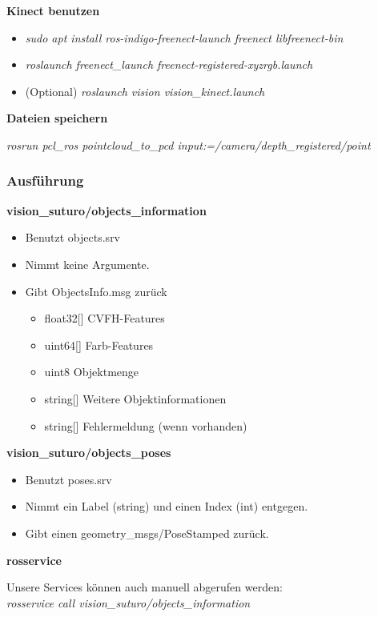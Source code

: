 \documentclass{suturo}
\begin{document}
\textbf{Kinect benutzen}
\begin{itemize}
\item \textit{sudo apt install ros-indigo-freenect-launch freenect libfreenect-bin}
\item \textit{roslaunch freenect\_launch freenect-registered-xyzrgb.launch}
\item (Optional) \textit{roslaunch vision vision\_kinect.launch}
\end{itemize}

\textbf{Dateien speichern}

    \textit{rosrun pcl\_ros pointcloud\_to\_pcd input:=/camera/depth\_registered/point}


\subsubsection{Ausf\"uhrung}

\textbf{vision\_suturo/objects\_information}
\begin{itemize}
\item Benutzt objects.srv
\item Nimmt keine Argumente.
\item Gibt ObjectsInfo.msg zurück
\begin{itemize}
\item float32[] CVFH-Features
\item uint64[] Farb-Features
\item uint8 Objektmenge
\item string[] Weitere Objektinformationen
\item string[] Fehlermeldung (wenn vorhanden)
\end{itemize}
\end{itemize}
\textbf{vision\_suturo/objects\_poses}
\begin{itemize}
\item Benutzt poses.srv
\item Nimmt ein Label (string) und einen Index (int) entgegen.
\item Gibt einen geometry\_msgs/PoseStamped zurück.
\end{itemize}

\textbf{rosservice}

Unsere Services k\"onnen auch manuell abgerufen werden: \\

\textit{rosservice call vision\_suturo/objects\_information} \\
\end{document}
